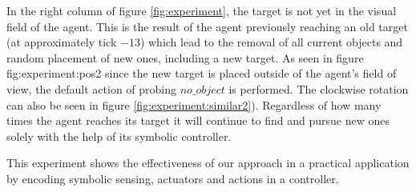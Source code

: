 \documentclass[a4paper,twoside]{article}
\begin{document}
In the right column of figure \ref{fig:experiment}, the target is not yet
in the visual field of the agent.
This is the result of the agent previously reaching an old target (at approximately tick $-13$) which lead
to the removal of all current objects and random placement of new ones,
including a new target.
As seen in figure {fig:experiment:pos2} since the new target is placed outside of the agent's field of view, the default
action of probing $no\_object$ is performed. The
clockwise rotation can also be seen in figure \ref{fig:experiment:similar2}). Regardless of how many times the agent reaches its target it will continue to find and pursue new ones solely with the help of its symbolic controller.

This experiment shows the effectiveness of our approach in a practical
application by encoding symbolic sensing, actuators and actions in a
controller.
\end{document}
